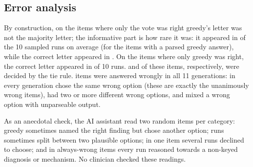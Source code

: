 \subsection{Error analysis}
By construction, on the \bMain{} items where only the vote was right greedy's letter was not the majority letter; the
informative part is how rare it was: it appeared in \bGreedyLetterRunsParsed{} of the 10 sampled runs on average (for
the \bParsedN{} items with a parsed greedy answer), while the correct letter appeared in \bKeyRuns. On the \cMain{}
items where only greedy was right, the correct letter appeared in \cKeyRuns{} of 10 runs. \tiesB{} and \tiesC{} of
these items, respectively, were decided by the tie rule. \allWrong{} items were answered wrongly in all 11
generations: in \allWrongSame{} every generation chose the same wrong option (these are exactly the unanimously wrong
items), \allWrongMixed{} had two or more different wrong options, and \allWrongUnparseable{} mixed a wrong option with
unparseable output.

As an anecdotal check, the AI assistant read two random items per category: greedy sometimes named the right
finding but chose another option; runs sometimes split between two plausible options; in one item several runs
declined to choose; and in always-wrong items every run reasoned towards a non-keyed diagnosis or mechanism. No
clinician checked these readings.
